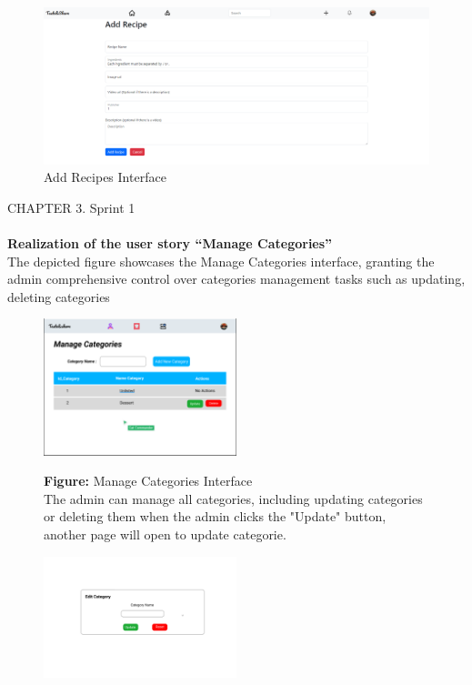 \documentclass{article}
\begin{document}
{{{\begin{figure}[htbp]
    \centering
    \includegraphics[width=1\textwidth]{addpic}
    \caption{Add Recipes Interface}
    \label{fig:design2}
\end{figure}
\newpage
\noindent
CHAPTER 3.  Sprint 1 \\
\underline{\hspace{\textwidth}} \vspace{0.2cm}
\\\textbf{Realization of the user story “Manage Categories”}\\
The depicted figure showcases the Manage Categories interface, granting the admin comprehensive control over categories management tasks such as updating, deleting categories\\
\begin{figure}[htbp]
    \centering
    \includegraphics[width=0.5\textwidth]{manegecat2} 
    \vspace{0.5cm}
    
    \textbf{Figure:} Manage Categories Interface \\
    The admin can manage all categories, including updating categories  or deleting them when the admin clicks the "Update" button, another page will open to update categorie.
\end{figure}


\begin{figure}[htbp]
    \centering
    \includegraphics[width=0.5\textwidth]{editcat} 
    \vspace{0.5cm}
    

\end{figure}}}}
\end{document}

